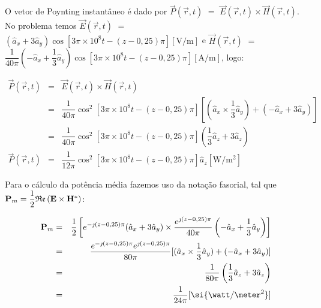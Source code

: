 \begin{enumerate}[1.]
O vetor de Poynting instantâneo é dado por $\vec{P}(\vec{r},t)$ $=$ $\vec{E}(\vec{r},t) \times \vec{H}(\vec{r},t)$. No problema temos $\vec{E}(\vec{r},t)$ $=$ $\left(\hat{a}_{x} + 3\hat{a}_{y}\right)\cos[3\pi \times 10^{8}t - (z - 0,25)\pi] [\si{\volt/\meter}]$ e $\vec{H}(\vec{r},t)$ $=$ $\dfrac{1}{40\pi}\left(-\hat{a}_{x} + \dfrac{1}{3}\hat{a}_{y}\right)\cos[3\pi \times 10^{8}t - (z - 0,25)\pi] [\si{\ampere/\meter}]$, logo:

\begin{eqnarray*}
  \vec{P}(\vec{r},t) & = & \vec{E}(\vec{r},t) \times \vec{H}(\vec{r},t) \nonumber \\
  & = & \dfrac{1}{40\pi}\cos^{2}[3\pi \times 10^{8}t - (z - 0,25)\pi][(\hat{a}_{x} \times \dfrac{1}{3} \hat{a}_{y}) + (-\hat{a}_{x} + 3\hat{a}_{y})] \nonumber \\
  & = & \dfrac{1}{40\pi}\cos^{2}[3\pi \times 10^{8}t - (z - 0,25)\pi](\dfrac{1}{3}\hat{a}_{z} + 3\hat{a}_{z}) \nonumber \\
  \vec{P}(\vec{r},t) & = &  \dfrac{1}{12\pi}\cos^{2}[3\pi \times 10^{8}t - (z - 0,25)\pi] \hat{a}_{z} [\si{\watt/\meter^{2}}] \nonumber
\end{eqnarray*}

Para o cálculo da potência média fazemos uso da notação fasorial, tal que ${\bf P}_{m} = \dfrac{1}{2}\mathfrak{Re}\left({\bf E} \times {\bf H}^{*} \right)$:

\begin{eqnarray*}  
  {\bf P}_{m} & = & \dfrac{1}{2}\left[e^{-\jmath (z - 0,25)\pi}(\hat{a}_{x} + 3\hat{a}_{y}) \times \dfrac{e^{\jmath (z - 0,25)\pi}}{40\pi}\left(-\hat{a}_{x} + \dfrac{1}{3}\hat{a}_{y}\right)\right] \nonumber \\
  & = & \dfrac{e^{-\jmath (z - 0,25)\pi} e^{\jmath (z - 0,25)\pi}}{80\pi} [(\hat{a}_{x} \times \dfrac{1}{3} \hat{a}_{y}) + \left(-\hat{a}_{x} + 3\hat{a}_{y}\right)] \nonumber \\
  & = & \dfrac{1}{80\pi}\left(\dfrac{1}{3}\hat{a}_{z} + 3\hat{a}_{z}\right) \nonumber \\
  & = & \dfrac{1}{24\pi} [\si{\watt/\meter^{2}}] \nonumber
\end{eqnarray*}

\end{enumerate}


